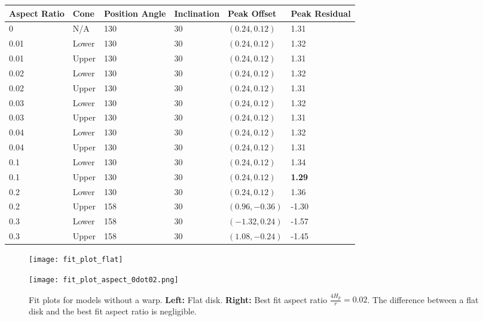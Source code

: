 \documentclass[a4paper]{tufte-handout}
\begin{document}
\begin{table}[!p]
  \begin{tabu} to \textwidth {X[r]X[r]X[r]X[r]X[r]X[r]}
    \toprule
    Aspect Ratio & Cone & Position Angle & Inclination &	Peak Offset   & Peak Residual\\
              & N/A  & 130        & 30        & $(0.24, 0.12)$ &	1.31\\
    0.01       & Lower& 130        & 30        & $(0.24, 0.12)$ &	1.32\\
    0.01       & Upper& 130        & 30        & $(0.24, 0.12)$ &	1.31\\
    0.02       & Lower& 130        & 30        & $(0.24, 0.12)$ &	1.32\\
    0.02       & Upper& 130        & 30        & $(0.24, 0.12)$ &	1.31\\
    0.03       & Lower& 130        & 30        & $(0.24, 0.12)$ &	1.32\\
    0.03       & Upper& 130        & 30        & $(0.24, 0.12)$ &	1.31\\
    0.04       & Lower& 130        & 30        & $(0.24, 0.12)$ &	1.32\\
    0.04       & Upper& 130        & 30        & $(0.24, 0.12)$ &	1.31\\
    0.1        & Lower& 130        & 30        & $(0.24, 0.12)$ &	1.34\\
    0.1        & Upper& 130        & 30        & $(0.24, 0.12)$&\textbf{1.29}\\
    0.2        & Lower& 130        & 30        & $(0.24, 0.12)$ &	1.36\\
    0.2        & Upper& 158        & 30        &$(0.96, -0.36)$ &	-1.30\\
    0.3        & Lower& 158        & 30        &$(-1.32, 0.24)$ &	-1.57\\
    0.3        & Upper& 158        & 30        &$(1.08, -0.24)$ &	-1.45\\
  \end{tabu}
\end{table}


\begin{figure}[!p]
  \label{fig:no warp fit plots}
  \centering
  \caption[No Warp Fit Plots]{Fit plots for models without a warp. \newline
  \noindent \textbf{Left:} Flat disk. \newline
  \noindent \textbf{Right:} Best fit aspect ratio $\frac{4H_p}{r}=0.02$. \newline
  \noindent The difference between a flat disk and the best fit aspect ratio is negligible.}
  \begin{minipage}{.5\textwidth}
    \texttt{[image: fit\_plot\_flat]}
  \end{minipage}%
  \begin{minipage}{.5\textwidth}
    \texttt{[image: fit\_plot\_aspect\_0dot02.png]}
  \end{minipage}
\end{figure}
\end{document}
